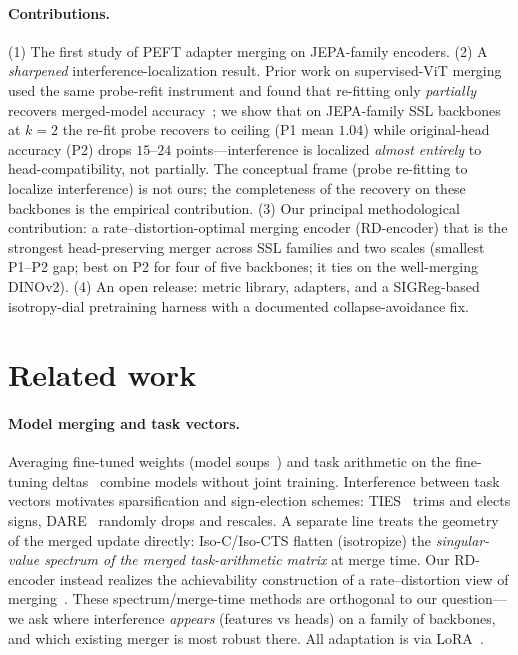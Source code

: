\documentclass{article}
\begin{document}
\paragraph{Contributions.}
(1) The first study of PEFT adapter merging on JEPA-family encoders.
(2) A \emph{sharpened} interference-localization result. Prior work on
supervised-ViT merging used the same probe-refit instrument and found that
re-fitting only \emph{partially} recovers merged-model
accuracy~\citep{sharma2024nonlocal}; we show that on JEPA-family SSL backbones
at $k{=}2$ the re-fit probe recovers to ceiling (P1 mean $1.04$) while
original-head accuracy (P2) drops $15$--$24$ points---interference is
localized \emph{almost entirely} to head-compatibility, not partially. The
conceptual frame (probe re-fitting to localize interference) is not ours; the
completeness of the recovery on these backbones is the empirical
contribution. (3) Our principal methodological contribution: a
rate--distortion-optimal merging encoder (RD-encoder) that is the strongest
head-preserving merger across SSL families and two scales (smallest P1--P2
gap; best on P2 for four of five backbones; it ties on the well-merging
DINOv2). (4) An open release: metric library, adapters, and a SIGReg-based
isotropy-dial pretraining harness with a documented collapse-avoidance fix.

\section{Related work}
\paragraph{Model merging and task vectors.} Averaging fine-tuned weights
(model soups~\cite{wortsman2022soups}) and task arithmetic on the
fine-tuning deltas~\cite{ilharco2023task} combine models without joint
training. Interference between task vectors motivates sparsification and
sign-election schemes: TIES~\cite{yadav2023ties} trims and elects signs,
DARE~\cite{yu2024dare} randomly drops and rescales. A separate line treats
the geometry of the merged update directly: Iso-C/Iso-CTS
\cite{marczak2025isotropic} flatten (isotropize) the \emph{singular-value
spectrum of the merged task-arithmetic matrix} at merge time. Our RD-encoder
instead realizes the achievability construction of a rate--distortion view of
merging~\cite{pathak2026rdmerge}. These spectrum/merge-time methods are
orthogonal to our question---we ask where interference \emph{appears}
(features vs heads) on a family of backbones, and which existing merger is
most robust there. All adaptation is via LoRA~\cite{hu2022lora}.
\end{document}
